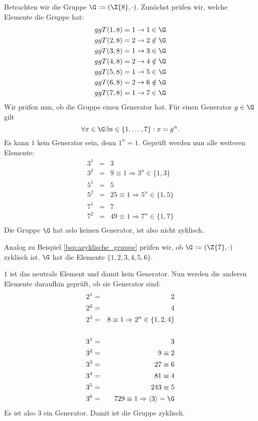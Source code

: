 \begin{beispiel}
\label{bsp:azyklische_gruppe}
Betrachten wir die Gruppe $\G := (\Z{8}, \cdot)$. Zunächst prüfen wir, welche
Elemente die Gruppe hat:
\begin{eqnarray*}
ggT(1, 8) = 1 \rightarrow 1 \in \G\\
ggT(2, 8) = 2 \rightarrow 2 \notin \G\\
ggT(3, 8) = 1 \rightarrow 3 \in \G\\
ggT(4, 8) = 2 \rightarrow 4 \notin \G\\
ggT(5, 8) = 1 \rightarrow 5 \in \G\\
ggT(6, 8) = 2 \rightarrow 6 \notin \G\\
ggT(7, 8) = 1 \rightarrow 7 \in \G\\
\end{eqnarray*}
Wir prüfen nun, ob die Gruppe einen Generator hat. Für einen Generator
$g \in \G$ gilt 
\[
\forall x \in \G \exists n\in\{1,\dots, 7\}: x = g^n.
\]
Es kann $1$ kein Generator sein, denn $1^n=1$. Geprüft werden nun alle
weiteren Elemente:
\begin{eqnarray*}
  3^1 & = & 3\\
  3^2 & = & 9 \equiv 1 \Rightarrow 3^n\in\{1, 3\}\\
  5^1 & = & 5\\
  5^2 & = & 25 \equiv 1 \Rightarrow 5^n\in\{1, 5\}\\
  7^1 & = & 7\\
  7^2 & = & 49 \equiv 1 \Rightarrow 7^n\in\{1, 7\}\\
\end{eqnarray*}
Die Gruppe $\G$ hat aslo keinen Generator, ist also nicht zyklisch.
\end{beispiel}

\begin{beispiel}
  Analog zu Beispiel \ref{bsp:azyklische_gruppe} prüfen wir, ob $\G :=
  (\Z{7}, \cdot)$ zyklisch ist. $\G$ hat die Elemente $\{1, 2, 3, 4, 5,
  6\}$.

  $1$ ist das neutrale Element und damit kein Generator. Nun werden die
  anderen Elemente daraufhin geprüft, ob sie Generator sind:
  \begin{eqnarray*}
    2^1 &= & 2\\
    2^2 &= & 4\\
    2^3 &= & 8 \equiv 1 \Rightarrow 2^n \in \{1, 2, 4\}\\
\\    
    3^1 &= & 3\\
    3^2 &= & 9 \equiv 2\\
    3^3 &= & 27 \equiv 6\\
    3^4 &= & 81 \equiv 4\\
    3^5 &= & 243 \equiv 5\\
    3^6 &= & 729 \equiv 1 \Rightarrow \langle 3\rangle = \G
  \end{eqnarray*}
  Es ist also $3$ ein Generator. Damit ist die Gruppe zyklisch.

\end{beispiel}